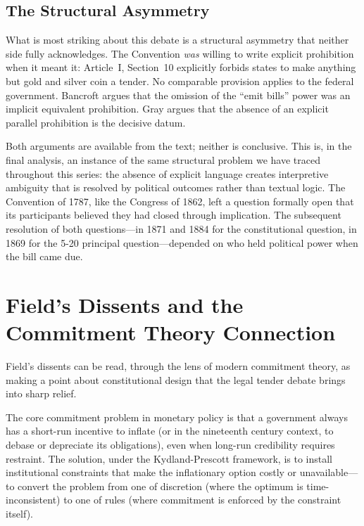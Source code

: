 \documentclass[12pt]{article}
\begin{document}
\subsection{The Structural Asymmetry}

What is most striking about this debate is a structural asymmetry
that neither side fully acknowledges. The Convention \textit{was}
willing to write explicit prohibition when it meant it: Article~I,
Section~10 explicitly forbids states to make anything but gold and
silver coin a tender. No comparable provision applies to the federal
government. Bancroft argues that the omission of the ``emit bills''
power was an implicit equivalent prohibition. Gray argues that the
absence of an explicit parallel prohibition is the decisive datum.

Both arguments are available from the text; neither is conclusive.
This is, in the final analysis, an instance of the same structural
problem we have traced throughout this series: the absence of explicit
language creates interpretive ambiguity that is resolved by political
outcomes rather than textual logic. The Convention of 1787, like the
Congress of 1862, left a question formally open that its participants
believed they had closed through implication. The subsequent resolution
of both questions---in 1871 and 1884 for the constitutional question,
in 1869 for the 5-20 principal question---depended on who held
political power when the bill came due.

\section{Field's Dissents and the Commitment Theory Connection}

Field's dissents can be read, through the lens of modern commitment
theory, as making a point about constitutional design that the legal
tender debate brings into sharp relief.

The core commitment problem in monetary policy is that a government
always has a short-run incentive to inflate (or in the nineteenth
century context, to debase or depreciate its obligations), even when
long-run credibility requires restraint. The solution, under the
Kydland-Prescott framework, is to install institutional constraints
that make the inflationary option costly or unavailable---to convert
the problem from one of discretion (where the optimum is time-inconsistent)
to one of rules (where commitment is enforced by the constraint itself).
\end{document}
